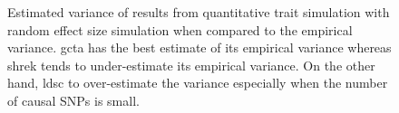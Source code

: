 \begin{figure}
{				
				\label{fig:ldscInQtRandVarCom}
			}
			\caption[Quantitative Trait with Random Effect Size Simulation Result(Estimated Variance)]
			{Estimated variance of results from quantitative trait simulation with random effect size simulation when compared to the empirical variance.
			\gls{gcta} has the best estimate of its empirical variance whereas \gls{shrek} tends to under-estimate its empirical variance.
			On the other hand, \gls{ldsc} to over-estimate the variance especially when the number of causal \glspl{SNP} is small.
				} 
			\label{fig:QtRandVarCom}
		\end{figure}